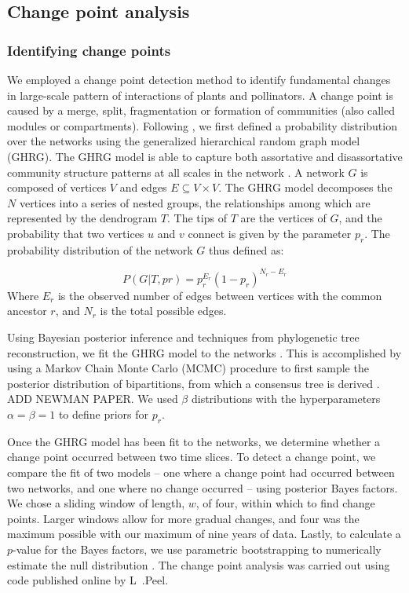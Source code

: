 \documentclass[12pt]{article}
\begin{document}
\subsection*{Change point analysis}
\subsubsection*{Identifying change points}
We employed a change point detection method \citep{peel2014detecting}
to identify fundamental changes in large-scale pattern of interactions
of plants and pollinators. A change point is caused by a merge, split,
fragmentation or formation of communities (also called modules or
compartments). Following \cite{peel2014detecting}, we first defined a
probability distribution over the networks using the generalized
hierarchical random graph model (GHRG). The GHRG model is able to
capture both assortative and disassortative community structure
patterns at all scales in the network \citep{peel2014detecting}. A
network $G$ is composed of vertices $V$ and edges $E \subseteq {V × V
}$. The GHRG model decomposes the $N$ vertices into a series of nested
groups, the relationships among which are represented by the
dendrogram $T$.  The tips of $T$ are the vertices of $G$, and the
probability that two vertices $u$ and $v$ connect is given by the
parameter $p_r$. The probability distribution of the network $G$ thus
defined as:

\begin{equation}
    \label{eq:lik}
    P(G|T,{pr}) = p_r^{E_r}(1-p_r)^{N_r-E_r}
\end{equation}
% 
Where $E_r$ is the observed number of edges between vertices with the
common ancestor $r$, and $N_r$ is the total possible edges. 

Using Bayesian posterior inference and techniques from phylogenetic
tree reconstruction, we fit the GHRG model to the networks
\citep{peel2014detecting}. This is accomplished by using a Markov
Chain Monte Carlo (MCMC) procedure to first sample the posterior
distribution of bipartitions, from which a consensus tree is derived
\citep{peel2014detecting}. ADD NEWMAN PAPER. We used $\beta$
distributions with the hyperparameters $\alpha=\beta=1$ to define
priors for $p_r$.

Once the GHRG model has been fit to the networks, we determine whether
a change point occurred between two time slices. To detect a change
point, we compare the fit of two models -- one where a change point
had occurred between two networks, and one where no change occurred --
using posterior Bayes factors. We chose a sliding window of length,
$w$, of four, within which to find change points. Larger windows allow
for more gradual changes, and four was the maximum possible with our
maximum of nine years of data. Lastly, to calculate a $p$-value for
the Bayes factors, we use parametric bootstrapping to numerically
estimate the null distribution \citep{peel2014detecting}. The change
point analysis was carried out using code published online by L~.Peel.
\end{document}
